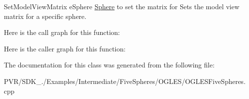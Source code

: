   Set\+Model\+View\+Matrix  e\+Sphere \hyperlink{class_sphere}{Sphere} to set the matrix for  Sets the model view matrix for a specific sphere. 

Here is the call graph for this function\+:




Here is the caller graph for this function\+:




The documentation for this class was generated from the following file\+:\begin{DoxyCompactItemize}
\item 
P\+V\+R/\+S\+D\+K\+\_./\+Examples/\+Intermediate/\+Five\+Spheres/\+O\+G\+L\+E\+S/O\+G\+L\+E\+S\+Five\+Spheres.\+cpp\end{DoxyCompactItemize}
